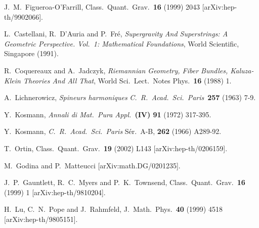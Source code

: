 \documentclass[12pt,a4paper]{article}
\begin{document}
\begin{thebibliography}{40}

J.~M.~Figueroa-O'Farrill,
Class.\ Quant.\ Grav.\  {\bf 16} (1999) 2043
[arXiv:hep-th/9902066].


 L.~Castellani, R.~D'Auria and P.~Fr\'e, 
                        {\sl Supergravity And Superstrings: 
                        A Geometric Perspective. 
                        Vol.~1: Mathematical Foundations}, 
                        World Scientific, Singapore (1991).


R.~Coquereaux and A.~Jadczyk,
{\sl Riemannian Geometry, Fiber Bundles, Kaluza-Klein Theories And All That},
World Sci.\ Lect.\ Notes Phys.\  {\bf 16} (1988) 1.

 A.~Lichnerowicz,
                  {\sl Spineurs harmoniques}
                  {\it C.~R.~Acad.~Sci.~Paris}~\textbf{257} (1963) 7-9.

 Y.~Kosmann,
                 {\it Annali di Mat.~Pura Appl.}~\textbf{(IV) 91}
                 (1972) 317-395.

 Y.~Kosmann,
                 {\it  C.~R.~Acad.~Sci.~Paris} S\'er.~A-B, \textbf{262} 
                 (1966) A289-92.


T.~Ortin,
Class.\ Quant.\ Grav.\  {\bf 19} (2002) L143
[arXiv:hep-th/0206159].

 M.~Godina and  P.~Matteucci
                  [arXiv:math.DG/0201235].

J.~P.~Gauntlett, R.~C.~Myers and P.~K.~Townsend,   
Class.\ Quant.\ Grav.\  {\bf 16} (1999) 1
[arXiv:hep-th/9810204].


H.~Lu, C.~N.~Pope and J.~Rahmfeld,
J.\ Math.\ Phys.\  {\bf 40} (1999) 4518
[arXiv:hep-th/9805151].



\end{thebibliography}
\end{document}
